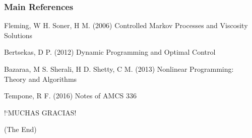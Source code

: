
\begin{frame}
\frametitle{Main References}
\footnotesize{
\begin{thebibliography}{99} %
 Fleming, W H. Soner, H M. (2006)
\newblock Controlled Markov Processes and Viscosity Solutions
\end{thebibliography}
}
\footnotesize{
\begin{thebibliography}{99} %
 Bertsekas, D P. (2012)
\newblock Dynamic Programming and Optimal Control
\end{thebibliography}
}
\footnotesize{
\begin{thebibliography}{99} %
 Bazaraa, M S. Sherali, H D. Shetty, C M. (2013)
\newblock Nonlinear Programming: Theory and Algorithms
\end{thebibliography}
}
\footnotesize{
\begin{thebibliography}{99} %
 Tempone, R F. (2016)
\newblock Notes of AMCS 336
\end{thebibliography}
}
\end{frame}


\begin{frame}
\Huge{\centerline{!`MUCHAS GRACIAS!}}
\LARGE{\centerline{(The End)}}
\end{frame}


